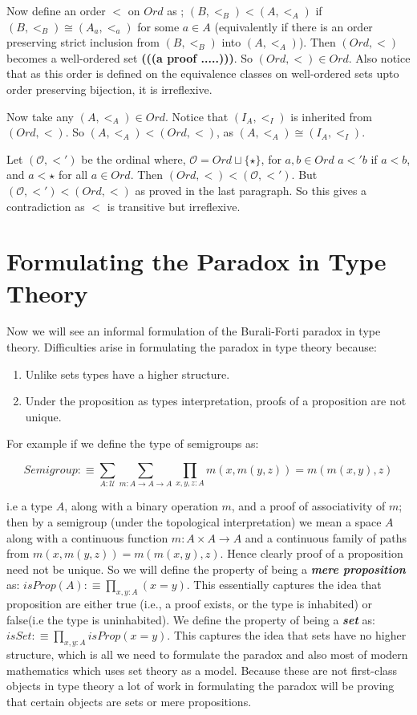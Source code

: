 \documentclass[10pt]{article}
\theoremstyle{definition}
\theoremstyle{plain}
\theoremstyle{remark}
\newcommand{\U}{\mathscr{U}}
\begin{document}
Now define an order $<$ on $Ord$ as ; $(B,<_B) < (A, <_A)$ if $(B, <_B) \cong (A_a, <_a)$ 
for some $a \in A$ (equivalently if there is an order preserving strict inclusion 
from $(B,<_B)$ into $(A,<_A)$). Then $(Ord, <)$ becomes a well-ordered set 
\textbf{(((a proof .....)))}. So $(Ord, <) \in Ord$. Also notice that as this order is defined 
on the equivalence classes on well-ordered sets upto order preserving bijection, it is 
irreflexive.\smallskip

Now take any $(A, <_A)\in Ord$. Notice that $(I_A, <_I)$ is inherited from ${(Ord, <)}$. So
$(A, <_A) < (Ord, <)$, as $(A,<_A) \cong (I_A, <_I)$.\smallskip

Let $(\mathcal{O}, <')$ be the ordinal where, $\mathcal{O} = Ord\sqcup \{\star\}$, for 
$a,b\in Ord$ $a<'b$ if $a<b$, and $a<\star$ for all $a\in Ord$. Then 
$(Ord,<)< (\mathcal{O},<')$. But $(\mathcal{O},<')<(Ord,<)$ as proved in the last paragraph.
So this gives a contradiction as $<$ is transitive but irreflexive. 

\section{Formulating the Paradox in Type Theory}\label{S:Form in TT}

Now we will see an informal formulation of the Burali-Forti paradox in type theory. 
Difficulties arise in formulating the paradox in type theory because:
\begin{enumerate}
\item Unlike sets types have a higher structure.
\item Under the proposition as types interpretation, proofs of a proposition are not unique.
\end{enumerate}

For example if we define the type of semigroups as:

\[ {Semigroup}:\equiv 	\sum_{A : \U} \sum_{m : A \to A \to A} 
    \prod_{x,y,z:A} m(x,m(y,z)) = m(m(x,y),z) \]
    
i.e a type $A$, along with a binary operation $m$, and a proof of associativity of $m$; then
by a semigroup (under the topological interpretation) we mean a space $A$ along with a
continuous function $m : A\times A \to A$ and a continuous family of paths from 
$m(x,m(y,z)) = m(m(x,y),z)$. Hence clearly proof of a proposition need not be unique. So
we will define the property of being a \textbf{\textit{mere proposition}} as:
${ {isProp}(A) :\equiv \prod_{x,y : A} (x = y) }$. This essentially captures the idea
that proposition are either true (i.e., a proof exists, or the type is inhabited) or false(i.e
the type is uninhabited). We define the property of being a \textbf{\textit{set}} as: 
${ {isSet} :\equiv \prod_{x,y:A} {isProp}(x=y)  }$. This captures the idea that sets
have no higher structure, which is all we need to formulate the paradox and also most of
modern mathematics which uses set theory as a model. Because these are not first-class 
objects in type theory a lot of work in formulating the paradox will be proving that certain
objects are sets or mere propositions.\smallskip
\end{document}
